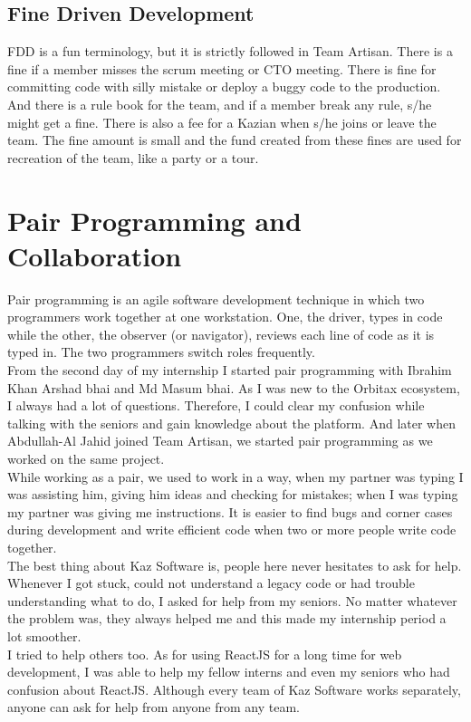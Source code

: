 \subsection{Fine Driven Development}

FDD is a fun terminology, but it is strictly followed in Team Artisan.
There is a fine if a member misses the scrum meeting or CTO meeting.
There is fine for committing code with silly mistake or deploy a buggy code to the production.
And there is a rule book for the team, and if a member break any rule, s/he might get a fine.
There is also a fee for a Kazian when s/he joins or leave the team.
The fine amount is small and the fund created from these fines are used for recreation of the team, like a party or a tour.

\section{Pair Programming and Collaboration}

Pair programming is an agile software development technique in which two programmers work together at one workstation. One, the driver, types in code
while the other, the observer (or navigator), reviews each line of code as it is typed in. The two programmers switch roles frequently.\\

From the second day of my internship I started pair programming with Ibrahim Khan Arshad bhai and Md Masum bhai.
As I was new to the Orbitax ecosystem, I always had a lot of questions.
Therefore, I could clear my confusion while talking with the seniors and gain knowledge about the platform.
And later when Abdullah-Al Jahid joined Team Artisan, we started pair programming as we worked on the same project.\\

While working as a pair, we used to work in a way, when my partner was typing I was assisting him, giving him ideas and checking for mistakes; when I was typing my partner was giving me instructions.
It is easier to find bugs and corner cases during development and write efficient code when two or more people write code together.\\

The best thing about Kaz Software is, people here never hesitates to ask for help.
Whenever I got stuck, could not understand a legacy code or had trouble understanding what to do, I asked for help from my seniors.
No matter whatever the problem was, they always helped me and this made my internship period a lot smoother.\\

I tried to help others too.
As for using ReactJS for a long time for web development, I was able to help my fellow interns and even my seniors who had confusion about ReactJS.
Although every team of Kaz Software works separately, anyone can ask for help from anyone from any team.

